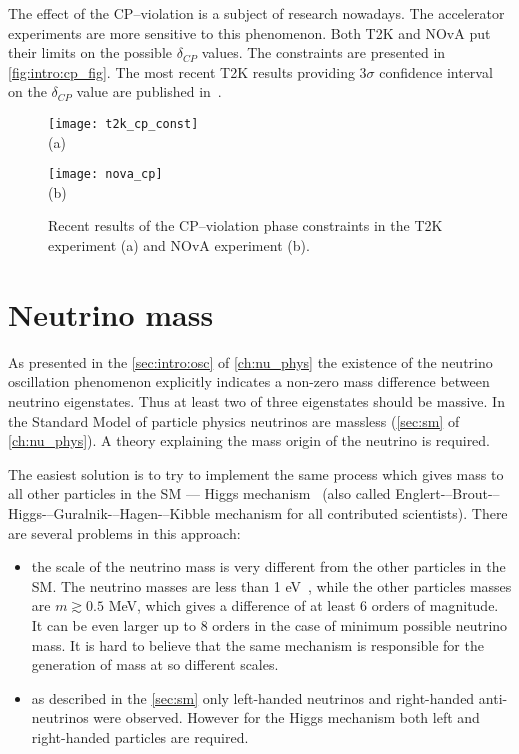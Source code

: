 \documentclass[../main.tex]{subfiles}
\begin{document}
The effect of the CP--violation is a subject of research nowadays. The accelerator experiments are more sensitive to this phenomenon. Both T2K and NOvA put their limits on the possible $\delta_{CP}$ values. The constraints are presented in \autoref{fig:intro:cp_fig}. The most recent T2K results providing 3$\sigma$ confidence interval on the $\delta_{CP}$ value are published in~\cite{Abe2020n}.

\begin{figure}
  \centering
  \begin{minipage}{0.49\linewidth}
    \centering
    \texttt{[image: t2k\_cp\_const]} \\ (a)
  \end{minipage}
  \begin{minipage}{0.49\linewidth}
    \centering
    \texttt{[image: nova\_cp]} \\ (b)
  \end{minipage}
  \caption{Recent results of the CP--violation phase constraints in the T2K experiment (a)\cite{Abe2020n} and NOvA experiment (b)\cite{Acero2019}.}
  \label{fig:intro:cp_fig}

\end{figure}


\chapter{Neutrino mass}
\label{ch:intro:HNL}

As presented in the \autoref{sec:intro:osc} of \autoref{ch:nu_phys} the existence of the neutrino oscillation phenomenon explicitly indicates a non-zero mass difference between neutrino eigenstates. Thus at least two of three eigenstates should be massive. In the Standard Model of particle physics neutrinos are massless (\autoref{sec:sm} of  \autoref{ch:nu_phys}). A theory explaining the mass origin of the neutrino is required.

The easiest solution is to try to implement the same process which gives mass to all other particles in the SM --- Higgs mechanism~\cite{Higgs1964} (also called Englert-–Brout-–Higgs-–Guralnik-–Hagen-–Kibble mechanism for all contributed scientists). There are several problems in this approach:
\begin{itemize}
  \item the scale of the neutrino mass is very different from the other particles in the SM. The neutrino masses are less than 1 eV~\cite{Aker2019}, while the other particles masses are $m\gtrsim 0.5$ MeV, which gives a difference of at least 6 orders of magnitude. It can be even larger up to 8 orders in the case of minimum possible neutrino mass. It is hard to believe that the same mechanism is responsible for the generation of mass at so different scales.
  \item as described in the \autoref{sec:sm} only left-handed neutrinos and right-handed anti-neutrinos were observed. However for the Higgs mechanism both left and right-handed particles are required.
\end{itemize}
\end{document}
